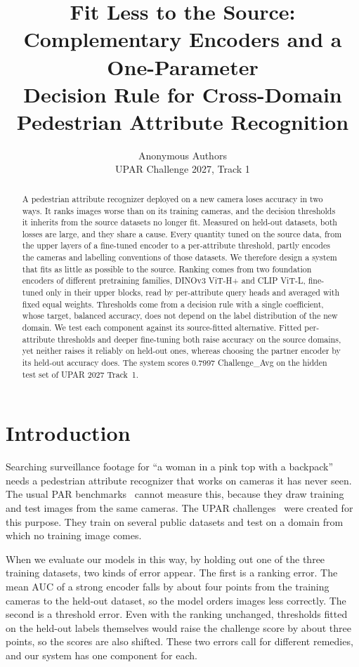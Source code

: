 \documentclass[10pt,twocolumn,letterpaper]{article}
\title{Fit Less to the Source: Complementary Encoders and a One-Parameter\\Decision Rule for Cross-Domain Pedestrian Attribute Recognition}
\author{Anonymous Authors\\
UPAR Challenge 2027, Track 1}
\begin{document}
\maketitle

\begin{abstract}
A pedestrian attribute recognizer deployed on a new camera loses accuracy in two ways. It ranks images worse than on its training cameras, and the decision thresholds it inherits from the source datasets no longer fit. Measured on held-out datasets, both losses are large, and they share a cause. Every quantity tuned on the source data, from the upper layers of a fine-tuned encoder to a per-attribute threshold, partly encodes the cameras and labelling conventions of those datasets. We therefore design a system that fits as little as possible to the source. Ranking comes from two foundation encoders of different pretraining families, DINOv3 ViT-H+ and CLIP ViT-L, fine-tuned only in their upper blocks, read by per-attribute query heads and averaged with fixed equal weights. Thresholds come from a decision rule with a single coefficient, whose target, balanced accuracy, does not depend on the label distribution of the new domain. We test each component against its source-fitted alternative. Fitted per-attribute thresholds and deeper fine-tuning both raise accuracy on the source domains, yet neither raises it reliably on held-out ones, whereas choosing the partner encoder by its held-out accuracy does. The system scores 0.7997 Challenge\_Avg on the hidden test set of UPAR 2027 Track~1.
\end{abstract}

\section{Introduction}
\label{sec:intro}

Searching surveillance footage for ``a woman in a pink top with a backpack'' needs a pedestrian attribute recognizer that works on cameras it has never seen. The usual PAR benchmarks~\cite{peta,pa100k,market} cannot measure this, because they draw training and test images from the same cameras. The UPAR challenges~\cite{upar,upar23,upar24} were created for this purpose. They train on several public datasets and test on a domain from which no training image comes.

When we evaluate our models in this way, by holding out one of the three training datasets, two kinds of error appear. The first is a ranking error. The mean AUC of a strong encoder falls by about four points from the training cameras to the held-out dataset, so the model orders images less correctly. The second is a threshold error. Even with the ranking unchanged, thresholds fitted on the held-out labels themselves would raise the challenge score by about three points, so the scores are also shifted. These two errors call for different remedies, and our system has one component for each.
\end{document}
